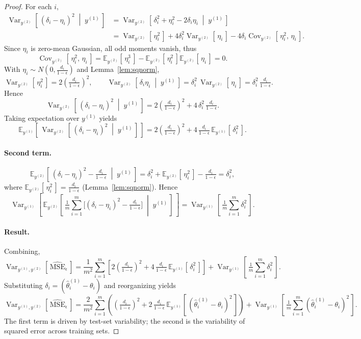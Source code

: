 \documentclass[11pt]{article}
\newcommand{\agiven}{\;\middle|\;}  %
\newcommand{\thetatrain}{\hat{\theta}^{(1)}}           %
\newcommand{\ytrain}{y^{(1)}}                           %
\newcommand{\ytest}{y^{(2)}}                            %
\newcommand{\msehat}{\widehat{\mathrm{MSE}}_{\epsilon}}
\newcommand{\E}[2][]{\mathbb{E}_{#1}\!\left[\,#2\,\right]}
\newcommand{\Var}[2][]{\operatorname{Var}_{#1}\!\left[\,#2\,\right]}
\newcommand{\Varthin}[1]{\Var[\ytrain, \ytest]{#1}}
\newcommand{\Cov}[3][]{\operatorname{Cov}_{#1}\!\left[\,#2,\,#3\,\right]}
\newcommand{\N}[2]{N\!\left(#1, #2\right)}
\theoremstyle{plain}
\theoremstyle{definition}
\theoremstyle{remark}
\begin{document}
\begin{proof}
For each $i$,
\begin{align*}
\Var[\ytest]{(\delta_i-\eta_i)^2 \agiven \ytrain}
&= \Var[\ytest]{\delta_i^2 + \eta_i^2 - 2\delta_i\eta_i \agiven \ytrain}\\
&= \Var[\ytest]{\eta_i^2} + 4\delta_i^2 \Var[\ytest]{\eta_i} - 4\delta_i \Cov[\ytest]{\eta_i^2}{\eta_i}.
\end{align*}
Since $\eta_i$ is zero-mean Gaussian, all odd moments vanish, thus
\[
\Cov[\ytest]{\eta_i^2}{\eta_i} = \E[\ytest]{\eta_i^3} - \E[\ytest]{\eta_i^2}\E[\ytest]{\eta_i} = 0.
\]
With $\eta_i \sim \N{0}{\tfrac{d_i}{1-\epsilon}}$ and Lemma~\ref{lem:sqnorm},
\[
\Var[\ytest]{\eta_i^2} = 2\!\left(\tfrac{d_i}{1-\epsilon}\right)^{\!2},
\qquad
\Var[\ytest]{\delta_i\eta_i \agiven \ytrain} = \delta_i^2\,\Var[\ytest]{\eta_i}
= \delta_i^2\,\tfrac{d_i}{1-\epsilon}.
\]
Hence
\[
\Var[\ytest]{(\delta_i-\eta_i)^2 \agiven \ytrain}
= 2\!\left(\tfrac{d_i}{1-\epsilon}\right)^{\!2} + 4\,\delta_i^2\,\tfrac{d_i}{1-\epsilon}.
\]
Taking expectation over $\ytrain$ yields
\[
\E[\ytrain]{ \Var[\ytest]{(\delta_i-\eta_i)^2 \agiven \ytrain} }
= 2\!\left(\tfrac{d_i}{1-\epsilon}\right)^{\!2}
+ 4\,\tfrac{d_i}{1-\epsilon}\,\E[\ytrain]{\delta_i^2}.
\]

\paragraph{Second term.}
\[
\E[\ytest]{(\delta_i-\eta_i)^2 - \tfrac{d_i}{1-\epsilon} \agiven \ytrain}
= \delta_i^2 + \E[\ytest]{\eta_i^2} - \tfrac{d_i}{1-\epsilon}
= \delta_i^2,
\]
where $\E[\ytest]{\eta_i^2}= \tfrac{d_i}{1-\epsilon}$ (Lemma~\ref{lem:sqnorm}). Hence
\[
\Var[\ytrain]{ \E[\ytest]{ \tfrac{1}{m}\sum_{i=1}^m \big[(\delta_i-\eta_i)^2 - \tfrac{d_i}{1-\epsilon}\big] \agiven \ytrain } }
= \Var[\ytrain]{ \tfrac{1}{m}\sum_{i=1}^m \delta_i^2 }.
\]

\paragraph{Result.}
Combining,
\[
\Varthin{\msehat}
= \frac{1}{m^2}\sum_{i=1}^m
\left[
2\!\left(\tfrac{d_i}{1-\epsilon}\right)^{\!2}
+ 4\,\tfrac{d_i}{1-\epsilon}\,\E[\ytrain]{\delta_i^2}
\right]
+ \Var[\ytrain]{ \tfrac{1}{m}\sum_{i=1}^m \delta_i^2 }.
\]
Substituting $\delta_i=(\thetatrain_i - \theta_i)$ and reorganizing yields
\begin{equation} \label{eq:variance}
\Varthin{\msehat}
= \frac{2}{m^2}\sum_{i=1}^m \!\left(
\!\left(\tfrac{d_i}{1-\epsilon}\right)^{\!2}
+ 2\,\tfrac{d_i}{1-\epsilon}\,\E[\ytrain]{(\thetatrain_i - \theta_i)^2}
\right)
+ \Var[\ytrain]{\tfrac{1}{m}\sum_{i=1}^m (\thetatrain_i - \theta_i)^2}.
\end{equation}
 The first term is driven by test-set variability; the second is the variability of squared error across training sets.
\end{proof}
\end{document}
